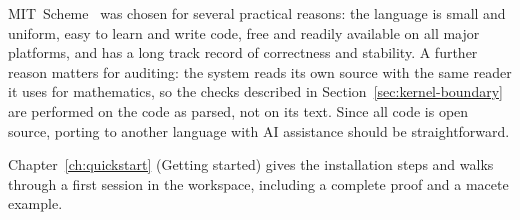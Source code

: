 MIT~Scheme~\cite{MITScheme} was chosen for several practical reasons: the language is
small and uniform, easy to learn and write code, free and readily
available on all major platforms, and has a long track record of
correctness and stability.  A further reason matters for auditing: the
system reads its own source with the same reader it uses for
mathematics, so the checks described in
Section~\ref{sec:kernel-boundary} are performed on the code as parsed,
not on its text.  Since all code is
open source, porting to another language with AI assistance should be
straightforward.



Chapter~\ref{ch:quickstart} (Getting started) gives the installation steps and walks through a first session in the workspace, including a complete proof and a macete example.
